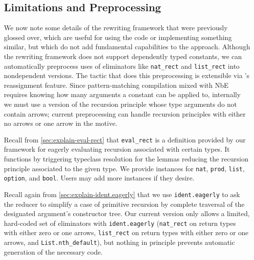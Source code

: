 \subsection{Limitations and Preprocessing}\label{sec:implementation-and-usage}


We now note some details of the rewriting framework that were previously glossed over, which are useful for using the code or implementing something similar, but which do not add fundamental capabilities to the approach.
Although the rewriting framework does not support dependently typed constants, we can automatically preprocess uses of eliminators like \texttt{nat_rect} and \texttt{list_rect} into nondependent versions.
The tactic that does this preprocessing is extensible via \Ltac{}'s reassignment feature.
Since pattern-matching compilation mixed with NbE requires knowing how many arguments a constant can be applied to, internally we must use a version of the recursion principle whose type arguments do not contain arrows; current preprocessing can handle recursion principles with either no arrows or one arrow in the motive.

Recall from \autoref{sec:explain-eval-rect} that \texttt{eval_rect} is a definition provided by our framework for eagerly evaluating recursion associated with certain types.
It functions by triggering typeclass resolution for the lemmas reducing the recursion principle associated to the given type.
We provide instances for \texttt{nat}, \texttt{prod}, \texttt{list}, \texttt{option}, and \texttt{bool}.
Users may add more instances if they desire.

Recall again from \autoref{sec:explain-ident.eagerly} that we use \texttt{ident.eagerly} to ask the reducer to simplify a case of primitive recursion by complete traversal of the designated argument's constructor tree.
Our current version only allows a limited, hard-coded set of eliminators with \texttt{ident.eagerly} (\texttt{nat\_rect} on return types with either zero or one arrows, \texttt{list\_rect} on return types with either zero or one arrows, and \texttt{List.nth\_default}), but nothing in principle prevents automatic generation of the necessary code.

